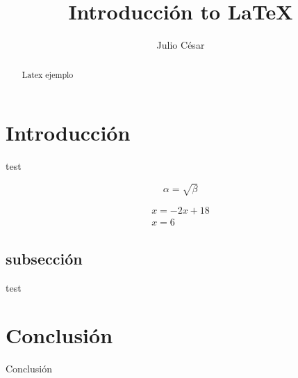 \documentclass{article}
\begin{document}
\title{Introducción to \LaTeX{}}
\author{Julio César}

\maketitle

\begin{abstract}
Latex ejemplo
\end{abstract}

\section{Introducción}
test

\begin{equation}
    \label{simple_equation}
    \alpha = \sqrt{ \beta }
\end{equation}

\begin{equation}
    \begin{aligned}
    x = -2x + 18 \\
    x=6
    \end{aligned}
\end{equation}

\subsection{subsección}
test

\section{Conclusión}
Conclusión
\end{document}
